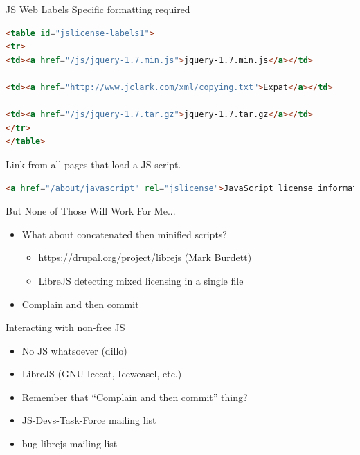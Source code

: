 \documentclass[11pt]{beamer}
\begin{document}
\begin{frame}[fragile]{JS Web Labels}
Specific formatting required\\
\begin{lstlisting}[language=HTML]
<table id="jslicense-labels1">
<tr>
<td><a href="/js/jquery-1.7.min.js">jquery-1.7.min.js</a></td>

<td><a href="http://www.jclark.com/xml/copying.txt">Expat</a></td>

<td><a href="/js/jquery-1.7.tar.gz">jquery-1.7.tar.gz</a></td>
</tr>
</table>
\end{lstlisting}

Link from all pages that load a JS script.
\begin{lstlisting}[language=HTML]
<a href="/about/javascript" rel="jslicense">JavaScript license information</a>
\end{lstlisting}
\end{frame}

\begin{frame}{But None of Those Will Work For Me...}
\begin{itemize}
\item What about concatenated then minified scripts?\pause
\begin{itemize}
\item https://drupal.org/project/librejs (Mark Burdett)\pause
\item LibreJS detecting mixed licensing in a single file\pause
\end{itemize}
\item Complain and then commit
\end{itemize}
\end{frame}

\begin{frame}{Interacting with non-free JS}
\begin{itemize}
\item No JS whatsoever (dillo)\pause
\item LibreJS (GNU Icecat, Iceweasel, etc.)\pause
\item Remember that ``Complain and then commit'' thing?\pause
\item JS-Devs-Task-Force mailing list\pause
\item bug-librejs mailing list
\end{itemize}
\end{frame}
\end{document}
